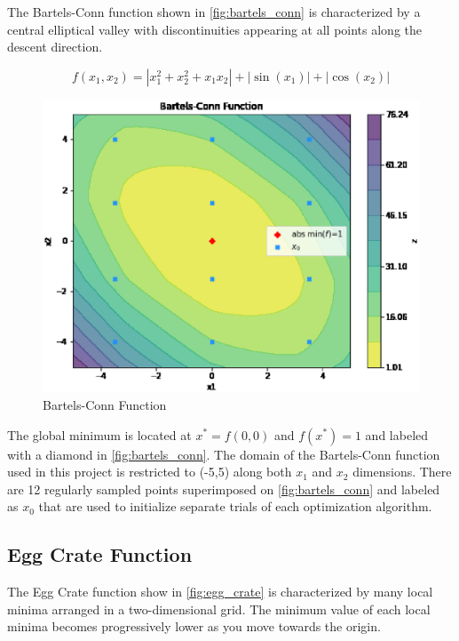 \documentclass{vgtc}                          %
\begin{document}
The Bartels-Conn function \cite{Jamil:2013:CoRR} shown in \autoref{fig:bartels_conn} is characterized by a central elliptical valley with discontinuities appearing at all points along the descent direction.

\begin{equation}
f(x_1, x_2) =  |x_1^2 + x_2^2 + x_1 x_2| + |\sin(x_1)| + |\cos(x_2)|
\end{equation}

\begin{figure}[tb]
\centering
\includegraphics[width=\columnwidth]{figures/pictures/images/bartels_conn-plot2d.eps}
\caption{Bartels-Conn Function}
\label{fig:bartels_conn}
\end{figure}

The global minimum is located at $x^* = f(0, 0)$ and $f(x^*) = 1$ and labeled with a diamond in \autoref{fig:bartels_conn}.  The domain of the Bartels-Conn function used in this project is restricted to (-5,5) along both $x_1$ and $x_2$ dimensions.  There are 12 regularly sampled points superimposed on \autoref{fig:bartels_conn} and labeled as $x_0$ that are used to initialize separate trials of each optimization algorithm.

\subsection{Egg Crate Function}

The Egg Crate function \cite{Jamil:2013:CoRR} show in \autoref{fig:egg_crate} is characterized by many local minima arranged in a two-dimensional grid.  The minimum value of each local minima becomes progressively lower as you move towards the origin.
\end{document}
